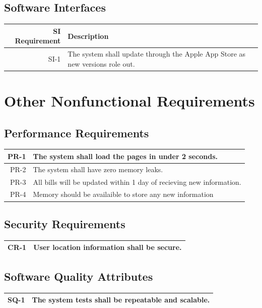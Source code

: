 \documentclass[12pt,oneside,letterpaper]{article}
\begin{document}
\subsection{Software Interfaces}
\begin{longtable}{|r|p{3.8in}|}
\hline
SI Requirement & Description \\
\hline
SI-1 & The system shall update through the Apple App Store as new versions role out.\\
\hline
\end{longtable}

\section{Other Nonfunctional Requirements}

\subsection{Performance Requirements}
\begin{longtable} {|r|p{3.8in}|}
\hline
PR-1 & The system shall load the pages in under 2 seconds. \\
\hline
PR-2 & The system shall have zero memory leaks. \\
\hline
PR-3 & All bills will be updated within 1 day of recieving new information. \\
\hline
PR-4 & Memory should be availaible to store any new information \\
\hline
\end{longtable}

\subsection{Security Requirements}
\begin{longtable}{|r|p{3.8in}|}
\hline
CR-1 & User location information shall be secure. \\
\hline
\end{longtable}

\subsection{Software Quality Attributes}
\begin{longtable} {|r|p{3.8in}|}
\hline
SQ-1 & The system tests shall be repeatable and scalable. \\
\hline
\end{longtable}
\end{document}
